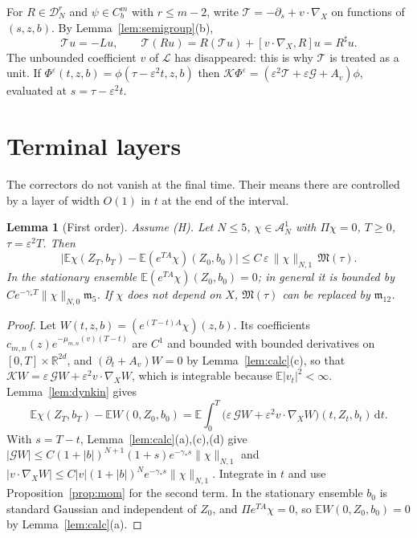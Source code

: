 \documentclass[11pt]{article}
\newcommand{\dd}{\mathrm{d}}
\newcommand{\E}{\mathbb{E}}
\newcommand{\eps}{\varepsilon}
\newcommand{\cL}{\mathcal{L}}
\newcommand{\cT}{\mathcal{T}}
\newcommand{\cG}{\mathcal{G}}
\newcommand{\cK}{\mathcal{K}}
\newcommand{\cA}{\mathcal{A}}
\newcommand{\cD}{\mathcal{D}}
\newcommand{\fm}{\mathfrak{m}}
\newcommand{\fM}{\mathfrak{M}}
\newcommand{\R}{\mathbb{R}}
\newcommand{\nrm}[2]{\|#1\|_{#2}}
\newtheorem{lemma}[theorem]{Lemma}
\theoremstyle{remark}
\begin{document}
For $R\in\cD_N^r$ and $\psi\in C_b^m$ with $r\le m-2$, write
$\cT=-\partial_s+v\cdot\nabla_X$ on functions of $(s,z,b)$. By
Lemma~\ref{lem:semigroup}(b),
\begin{equation}
  \cT u=-Lu,\qquad
  \cT(Ru)=R(\cT u)+[v\cdot\nabla_X,R]u=R^\sharp u .
  \label{eq:sharp}
\end{equation}
The unbounded coefficient $v$ of $\cL$ has disappeared: this is why $\cT$
is treated as a unit. If $\Phi^\eps(t,z,b)=\phi(\tau-\eps^2t,z,b)$ then
$\cK\Phi^\eps=(\eps^2\cT+\eps\cG+A_v)\phi$, evaluated at $s=\tau-\eps^2t$.

\section{Terminal layers}

The correctors do not vanish at the final time. Their means there are
controlled by a layer of width $O(1)$ in $t$ at the end of the interval.

\begin{lemma}[First order]\label{lem:T1}
Assume (H). Let $N\le5$, $\chi\in\cA_N^1$ with $\Pi\chi=0$, $T\ge0$,
$\tau=\eps^2T$. Then
\[
  \bigl|\E\chi(Z_T,b_T)-\E(e^{TA}\chi)(Z_0,b_0)\bigr|
  \le C\,\eps\,\nrm{\chi}{N,1}\,\fM(\tau).
\]
In the stationary ensemble $\E(e^{TA}\chi)(Z_0,b_0)=0$; in general it is
bounded by $Ce^{-\gamma_*T}\nrm{\chi}{N,0}\fm_5$. If $\chi$ does not depend
on $X$, $\fM(\tau)$ can be replaced by $\fm_{12}$.
\end{lemma}

\begin{proof}
Let $W(t,z,b)=(e^{(T-t)A}\chi)(z,b)$. Its coefficients
$c_{m,n}(z)e^{-\mu_{m,n}(v)(T-t)}$ are $C^1$ and bounded with bounded
derivatives on $[0,T]\times\R^{2d}$, and $(\partial_t+A_v)W=0$ by
Lemma~\ref{lem:calc}(c), so that $\cK W=\eps\,\cG W+\eps^2v\cdot\nabla_XW$,
which is integrable because $\E|v_t|^2<\infty$. Lemma~\ref{lem:dynkin}
gives
\[
  \E\chi(Z_T,b_T)-\E W(0,Z_0,b_0)
  =\E\int_0^T\bigl(\eps\,\cG W+\eps^2v\cdot\nabla_XW\bigr)(t,Z_t,b_t)\,\dd t .
\]
With $s=T-t$, Lemma~\ref{lem:calc}(a),(c),(d) give
$|\cG W|\le C(1+|b|)^{N+1}(1+s)e^{-\gamma_*s}\nrm{\chi}{N,1}$ and
$|v\cdot\nabla_XW|\le C|v|(1+|b|)^Ne^{-\gamma_*s}\nrm{\chi}{N,1}$. Integrate
in $t$ and use Proposition~\ref{prop:mom} for the second term. In the
stationary ensemble $b_0$ is standard Gaussian and independent of $Z_0$, and
$\Pi e^{TA}\chi=0$, so $\E W(0,Z_0,b_0)=0$ by Lemma~\ref{lem:calc}(a).
\end{proof}
\end{document}
